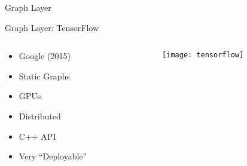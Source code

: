 
\begin{slide}{Graph Layer}
\end{slide}

\begin{slide}{Graph Layer: TensorFlow}
  \begin{columns}
    \begin{column}{0.5\textwidth}
      \begin{itemize}
        \item Google (2015)
        \item Static Graphs
        \item GPUs \cmark
        \item Distributed \cmark
        \item C++ API \xmark
        \item Very ``Deployable''
      \end{itemize}
    \end{column}
    \begin{column}{0.5\textwidth}
      \texttt{[image: tensorflow]}
    \end{column}
  \end{columns}
\end{slide}

